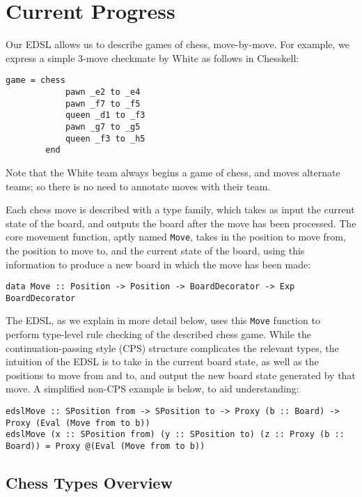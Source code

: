 \documentclass[12pt, a4paper, bibliography=totocnumbered]{scrartcl}
\begin{document}
\section{Current Progress} \label{examplegame}

Our EDSL allows us to describe games of chess, move-by-move. For example, we express a simple 3-move checkmate by White as follows in Chesskell:

\begin{lstlisting}
game = chess
            pawn _e2 to _e4
            pawn _f7 to _f5
            queen _d1 to _f3
            pawn _g7 to _g5
            queen _f3 to _h5
        end
\end{lstlisting}

Note that the White team always begins a game of chess, and moves alternate teams; so there is no need to annotate moves with their team.

Each chess move is described with a type family, which takes as input the current state of the board, and outputs the board after the move has been processed. The core movement function, aptly named \lstinline[basicstyle=\ttfamily]{Move}, takes in the position to move from, the position to move to, and the current state of the board, using this information to produce a new board in which the move has been made:

\begin{lstlisting}
data Move :: Position -> Position -> BoardDecorator -> Exp BoardDecorator
\end{lstlisting}

The EDSL, as we explain in more detail below, uses this \lstinline[basicstyle=\ttfamily]{Move} function to perform type-level rule checking of the described chess game. While the continuation-passing style (CPS) structure complicates the relevant types, the intuition of the EDSL is to take in the current board state, as well as the positions to move from and to, and output the new board state generated by that move. A simplified non-CPS example is below, to aid understanding:

\begin{lstlisting}
edslMove :: SPosition from -> SPosition to -> Proxy (b :: Board) -> Proxy (Eval (Move from to b))
edslMove (x :: SPosition from) (y :: SPosition to) (z :: Proxy (b :: Board)) = Proxy @(Eval (Move from to b))
\end{lstlisting}

\subsection{Chess Types Overview}
\end{document}
